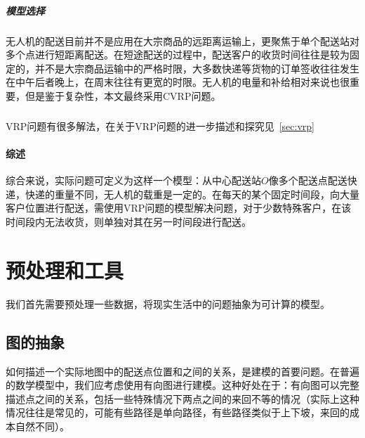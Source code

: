 \documentclass[UTF8,a4paper]{ctexart}
\begin{document}
\subparagraph{模型选择}无人机的配送目前并不是应用在大宗商品的远距离运输上，更聚焦于单个配送站对多个点进行短距离配送。在短途配送的过程中，配送客户的收货时间往往是较为固定的，并不是大宗商品运输中的严格时限，大多数快递等货物的订单签收往往发生在中午后者晚上，在周末往往有更宽的时限。无人机的电量和补给相对来说也很重要，但是鉴于复杂性，本文最终采用CVRP问题。

\subparagraph{}VRP问题有很多解法，在关于VRP问题的进一步描述和探究见~\ref{sec:vrp}

\paragraph{综述} 综合来说，实际问题可定义为这样一个模型：从中心配送站$O$像多个配送点配送快递，快递的重量不同，无人机的载重是一定的。在每天的某个固定时间段，向大量客户位置进行配送，需使用VRP问题的模型解决问题，对于少数特殊客户，在该时间段内无法收货，则单独对其在另一时间段进行配送。






\section{预处理和工具}
我们首先需要预处理一些数据，将现实生活中的问题抽象为可计算的模型。
\subsection{图的抽象}
如何描述一个实际地图中的配送点位置和之间的关系，是建模的首要问题。在普遍的数学模型中，我们应考虑使用有向图进行建模。这种好处在于：有向图可以完整描述点之间的关系，包括一些特殊情况下两点之间的来回不等的情况（实际上这种情况往往是常见的，可能有些路径是单向路径，有些路径类似于上下坡，来回的成本自然不同）。
\end{document}
